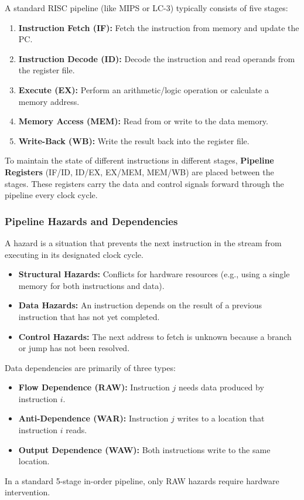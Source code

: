 \begin{definition}
	A standard RISC pipeline (like MIPS or LC-3) typically consists of five stages:
	\begin{enumerate}
		\item \textbf{Instruction Fetch (IF):} Fetch the instruction from memory and update the PC.
		\item \textbf{Instruction Decode (ID):} Decode the instruction and read operands from the register file.
		\item \textbf{Execute (EX):} Perform an arithmetic/logic operation or calculate a memory address.
		\item \textbf{Memory Access (MEM):} Read from or write to the data memory.
		\item \textbf{Write-Back (WB):} Write the result back into the register file.
	\end{enumerate}
\end{definition}

\begin{important}
	To maintain the state of different instructions in different stages, \textbf{Pipeline Registers} (IF/ID, ID/EX, EX/MEM, MEM/WB) are placed between the stages. These registers carry the data and control signals forward through the pipeline every clock cycle.
\end{important}

\subsubsection{Pipeline Hazards and Dependencies}

\begin{definition}
	A hazard is a situation that prevents the next instruction in the stream from executing in its designated clock cycle.
	\begin{itemize}
		\item \textbf{Structural Hazards:} Conflicts for hardware resources (e.g., using a single memory for both instructions and data).
		\item \textbf{Data Hazards:} An instruction depends on the result of a previous instruction that has not yet completed.
		\item \textbf{Control Hazards:} The next address to fetch is unknown because a branch or jump has not been resolved.
	\end{itemize}
\end{definition}

\begin{definition}
	Data dependencies are primarily of three types:
	\begin{itemize}
		\item \textbf{Flow Dependence (RAW):} Instruction $j$ needs data produced by instruction $i$.
		\item \textbf{Anti-Dependence (WAR):} Instruction $j$ writes to a location that instruction $i$ reads.
		\item \textbf{Output Dependence (WAW):} Both instructions write to the same location.
	\end{itemize}
	In a standard 5-stage in-order pipeline, only RAW hazards require hardware intervention.
\end{definition}


